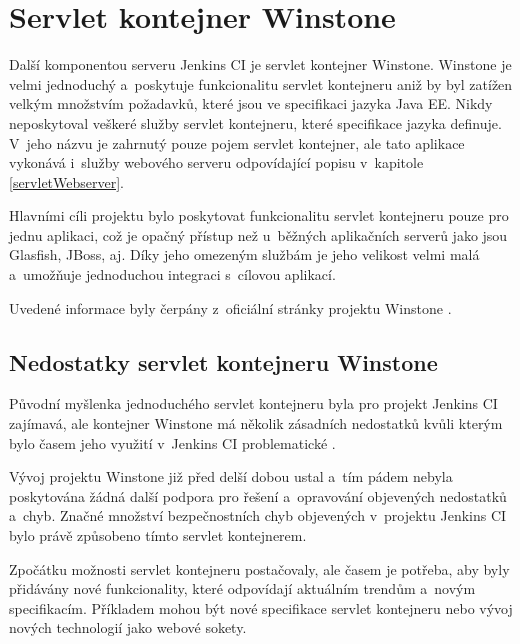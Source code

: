     \section{Servlet kontejner Winstone} \label{winstone}
        Další komponentou serveru Jenkins CI je servlet kontejner Winstone.
        Winstone je velmi jednoduchý a~poskytuje funkcionalitu
        servlet kontejneru aniž by byl zatížen velkým množstvím požadavků, které jsou ve specifikaci jazyka Java EE.
        Nikdy neposkytoval veškeré služby servlet kontejneru, které specifikace jazyka definuje. 
        V~jeho názvu je zahrnutý pouze pojem servlet kontejner, ale tato aplikace vykonává i~služby
        webového serveru odpovídající popisu v~kapitole \ref{servletWebserver}.

        Hlavními cíli projektu bylo poskytovat funkcionalitu servlet kontejneru pouze pro jednu aplikaci,
        což je opačný přístup než u~běžných aplikačních serverů jako jsou Glasfish, JBoss, aj.
        Díky jeho omezeným službám je jeho velikost velmi malá a~umožňuje jednoduchou integraci
        s~cílovou aplikací.

        Uvedené informace byly čerpány z~oficiální stránky projektu Winstone \cite{winstoneWeb}.

        \subsection{Nedostatky servlet kontejneru Winstone}
            Původní myšlenka jednoduchého servlet kontejneru byla pro projekt Jenkins CI zajímavá, ale
            kontejner Winstone má několik zásadních nedostatků kvůli kterým bylo časem jeho využití
            v~Jenkins CI problematické \cite{kohsukeTopic}. 

            Vývoj projektu Winstone již před delší dobou ustal a~tím pádem nebyla poskytována 
            žádná další podpora pro řešení a~opravování objevených nedostatků a~chyb. 
            Značné množství bezpečnostních chyb objevených v~projektu Jenkins CI bylo právě
            způsobeno tímto servlet kontejnerem.

            Zpočátku možnosti servlet kontejneru postačovaly, ale časem je potřeba, aby 
            byly přidávány nové funkcionality, které odpovídají aktuálním trendům
            a~novým specifikacím. Příkladem mohou být nové specifikace servlet kontejneru nebo
            vývoj nových technologií jako webové sokety.


